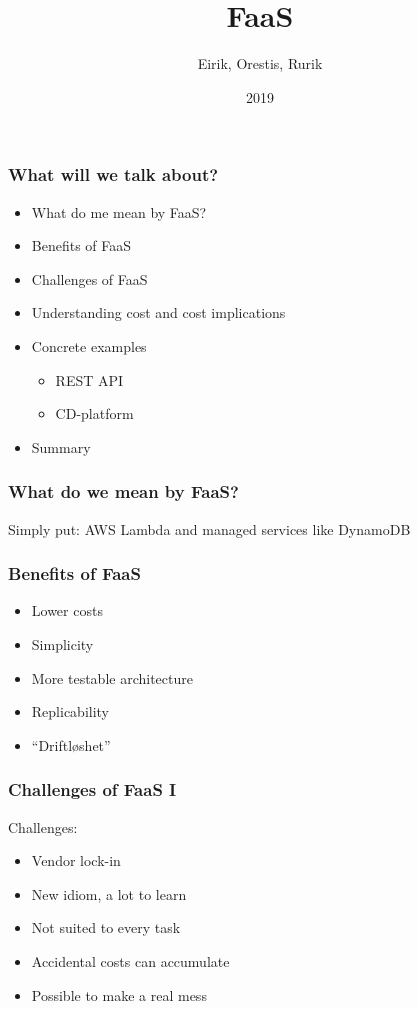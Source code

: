 \documentclass{beamer}
\title{FaaS}
\author{Eirik, Orestis, Rurik}
\institute{Unit}
\date{2019}
\begin{document}
\frame{\titlepage}

\begin{frame}
\frametitle{What will we talk about?}
\begin{itemize}
  \item What do me mean by FaaS?
  \item Benefits of FaaS
  \item Challenges of FaaS
  \item Understanding cost and cost implications
  \item Concrete examples
  \begin{itemize}
    \item REST API
    \item CD-platform
  \end{itemize}
  \item Summary
\end{itemize}
\end{frame}

\begin{frame}
\frametitle{What do we mean by FaaS?}
Simply put: AWS Lambda and managed services like DynamoDB
\end{frame}

\begin{frame}
\frametitle{Benefits of FaaS}
\begin{itemize}
  \item Lower costs
  \item Simplicity
  \item More testable architecture
  \item Replicability
  \item ``Driftløshet''
\end{itemize}
\end{frame}

\begin{frame}
\frametitle{Challenges of FaaS I}
Challenges:
\begin{itemize}
  \item Vendor lock-in
  \item New idiom, a lot to learn
  \item Not suited to every task
  \item Accidental costs can accumulate
  \item Possible to make a real mess
\end{itemize}
\end{frame}
\end{document}
